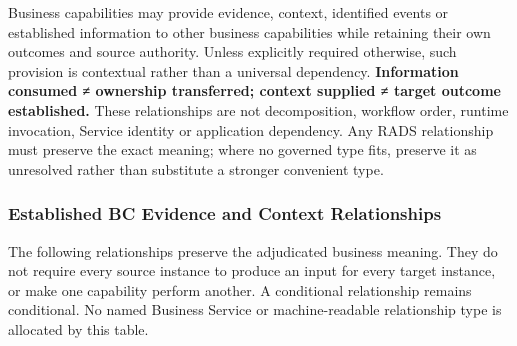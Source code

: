 \label{rad:business:1239}

Business capabilities may provide evidence, context, identified events or established information to other business capabilities while retaining their own outcomes and source authority. Unless explicitly required otherwise, such provision is contextual rather than a universal dependency. \textbf{Information consumed ≠ ownership transferred; context supplied ≠ target outcome established.} These relationships are not decomposition, workflow order, runtime invocation, Service identity or application dependency. Any RADS relationship must preserve the exact meaning; where no governed type fits, preserve it as unresolved rather than substitute a stronger convenient type.

\label{rad:business:1249}
\subsubsection*{Established BC Evidence and Context Relationships}
\label{rad:business:1251}

The following relationships preserve the adjudicated business meaning. They do not require every source instance to produce an input for every target instance, or make one capability perform another. A conditional relationship remains conditional. No named Business Service or machine-readable relationship type is allocated by this table.

